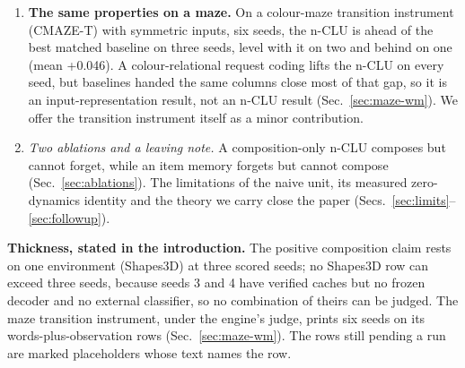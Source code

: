 \documentclass{article} %
\begin{document}
\begin{enumerate}[leftmargin=*,itemsep=2pt]
  takes 2,367 to 5,913 s, so this is neither a size nor a speed claim. Refusal after deletion is a %
  separate, structural mechanism, a hole in a coupling table (Sec.~\ref{sec:hole}).
\item \textbf{The same properties on a maze.} On a colour-maze transition instrument (CMAZE-T) with
  symmetric inputs, six seeds, the n-CLU is ahead of
  the best matched baseline on three seeds, level with it on two and behind on one (mean
  +0.046). A colour-relational request coding lifts the n-CLU on every seed, but baselines handed the %
  same columns close most of that gap, so it is an input-representation result, not an n-CLU result
  (Sec.~\ref{sec:maze-wm}). We offer the transition instrument itself as a minor contribution.
\item \emph{Two ablations and a leaving note.} A composition-only n-CLU composes but cannot
  forget, while an item memory forgets but cannot compose (Sec.~\ref{sec:ablations}). The
  limitations of the naive unit, its measured zero-dynamics identity and the theory we carry
  close the paper (Secs.~\ref{sec:limits}--\ref{sec:followup}).
\end{enumerate}

\noindent\textbf{Thickness, stated in the introduction.} The positive composition claim rests
on one environment (Shapes3D) at three scored seeds; no Shapes3D row can exceed three seeds,
because seeds 3 and 4 have verified caches but no frozen decoder and no external classifier, so no
combination of theirs can be judged. %
The maze transition instrument, under the engine's judge, prints six seeds on its words-plus-observation rows
(Sec.~\ref{sec:maze-wm}). The rows still pending a run are marked placeholders whose text names the row.

\end{document}
